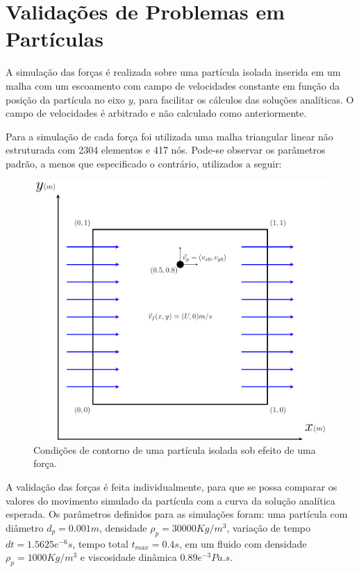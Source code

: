 

\section{\textbf{Validações de Problemas em Partículas}}
\label{sec_particulas}
A simulação das forças é realizada sobre uma partícula isolada inserida em um malha com um escoamento com campo de velocidades constante em função da posição da partícula no eixo $y$, para facilitar os cálculos das soluções analíticas.
O campo de velocidades é arbitrado e não calculado como anteriormente.

Para a simulação de cada força foi utilizada uma malha triangular linear não estruturada com 2304 elementos e 417 nós.
Pode-se observar os parâmetros padrão, a menos que especificado o contrário, utilizados a seguir:
\begin{figure}[H]
    \centering
    \includegraphics[width=0.7\linewidth]{figures/forces_boundary_conditions.pdf}
    \caption{Condições de contorno de uma partícula isolada sob efeito de uma força.}
    \label{force_bc}
\end{figure}
A validação das forças é feita individualmente, para que se possa comparar os valores do movimento simulado da partícula com a curva da solução analítica esperada.
Os parâmetros definidos para as simulações foram: uma partícula com diâmetro $d_p=0.001m$, densidade $\rho_p=30000Kg/m^3$, variação de tempo $dt=1.5625e^{-6}s$, tempo total $t_{max}=0.4s$, em um fluido com densidade $\rho_p=1000Kg/m^3$ e viscosidade dinâmica $0.89e^{-3}Pa.s$.

